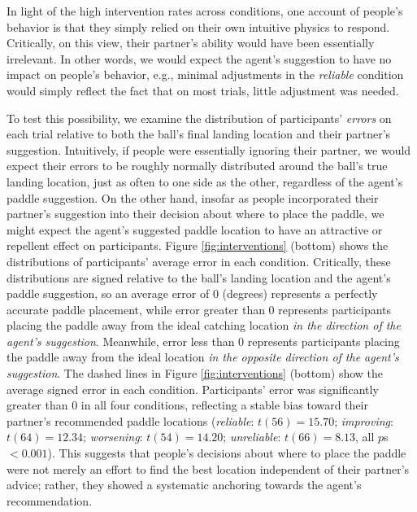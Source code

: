 \documentclass[10pt,letterpaper]{article}
\begin{document}
In light of the high intervention rates across conditions, one account of people's behavior is that they simply relied on their own intuitive physics to respond. Critically, on this view, their partner's ability would have been essentially irrelevant. In other words, we would expect the agent's suggestion to have no impact on people's behavior, e.g., minimal adjustments in the \textit{reliable} condition would simply reflect the fact that on most trials, little adjustment was needed. 

To test this possibility, we examine the distribution of participants' \textit{errors} on each trial relative to both the ball's final landing location and their partner's suggestion. Intuitively, if people were essentially ignoring their partner, we would expect their errors to be roughly normally distributed around the ball's true landing location, just as often to one side as the other, regardless of the agent's paddle suggestion. On the other hand, insofar as people incorporated their partner's suggestion into their decision about where to place the paddle, we might expect the agent's suggested paddle location to have an attractive or repellent effect on participants. Figure \ref{fig:interventions} (bottom) shows the distributions of participants' average error in each condition. Critically, these distributions are signed relative to the ball's landing location and the agent's paddle suggestion, so an average error of 0 (degrees) represents a perfectly accurate paddle placement, while error greater than 0 represents participants placing the paddle away from the ideal catching location \textit{in the direction of the agent's suggestion}. Meanwhile, error less than 0 represents participants placing the paddle away from the ideal location \textit{in the opposite direction of the agent's suggestion}. The dashed lines in Figure \ref{fig:interventions} (bottom) show the average signed error in each condition. Participants' error was significantly greater than $0$ in all four conditions, reflecting a stable bias toward their partner's recommended paddle locations (\textit{reliable}: $t(56) = 15.70$; \textit{improving}: $t(64) = 12.34$; \textit{worsening}: $t(54) = 14.20$; \textit{unreliable}: $t(66) = 8.13$, all $p$s $< 0.001$). This suggests that people's decisions about where to place the paddle were not merely an effort to find the best location independent of their partner's advice; rather, they showed a systematic anchoring towards the agent's recommendation.
\end{document}
